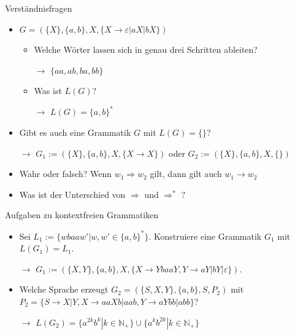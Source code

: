 \documentclass[]{beamer}
\begin{document}
\begin{frame}{Verständnisfragen}
	\begin{itemize}
		\item $G = (\{X\}, \{a,b\}, X, \{X \rightarrow \varepsilon| aX| bX\})$
		\begin{itemize}
			\item Welche Wörter lassen sich in genau drei Schritten ableiten?
			\pause		 		
			\item[$\rightarrow$] $\{aa, ab, ba, bb\}$
			\pause
			\item Was ist $L(G)$?
			\pause		 		
			\item[$\rightarrow$] $L(G) = \{a,b\}^*$
		\end{itemize}
		\pause
		\item Gibt es auch eine Grammatik $G$ mit $L(G) = \{\}$?
		\pause
		\item[$\rightarrow$] $G_1 := (\{X\}, \{a,b\}, X, \{X\rightarrow X\})$ oder $G_2 := (\{X\}, \{a,b\}, X, \{\})$
		\pause
		\item Wahr oder falsch? Wenn $w_1 \Rightarrow w_2$ gilt, dann gilt auch $w_1 \rightarrow w_2$
		\pause
		\item Was ist der Unterschied von $\Rightarrow$ und $\Rightarrow^*$ ?
	\end{itemize}
\end{frame}

\begin{frame}
	\begin{taskblock}{Aufgaben zu kontextfreien Grammatiken}
		\begin{itemize}
			\item Sei $L_1 := \{wbaaw'|w, w' \in \{a,b\}^*\}$. Konstruiere eine Grammatik $G_1$ mit $L(G_1) = L_1$.
			\pause
			\item[$\rightarrow$] $G_1 := (\{X, Y\}, \{a,b\}, X, \{X \rightarrow YbaaY, Y \rightarrow aY|bY|\varepsilon\})$.
			\pause
			\item  Welche Sprache erzeugt $ G_2 = (\{S, X, Y\}, \{a,b\}, S, P_2)$  mit $P_2 = \{S \rightarrow X|Y, X \rightarrow aaXb|aab, Y \rightarrow aYbb|abb\}$?
			\pause			
			\item[$\rightarrow$] $L(G_2) = \{a^{2k}b^{k} | k \in \mathbb{N}_+\} \cup \{a^kb^{2k}| k \in \mathbb{N}_+\}$
		\end{itemize}
	\end{taskblock}	
\end{frame}
\end{document}
